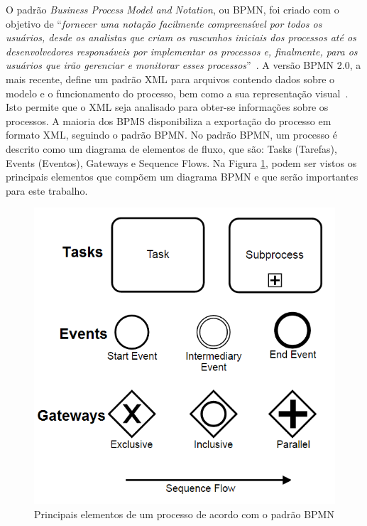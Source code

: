 \documentclass[12pt]{article}
\begin{document}

O padrão \emph{Business Process Model and Notation}, ou BPMN, foi criado com o objetivo de ``\emph{fornecer uma notação facilmente compreensível por todos os usuários, desde os analistas que criam os rascunhos iniciais dos processos até os desenvolvedores responsáveis por implementar os processos e, finalmente, para os usuários que irão gerenciar e monitorar esses processos}''~\cite{model2011notation}. A versão BPMN 2.0, a mais recente, define um padrão XML para arquivos contendo dados sobre o modelo e o funcionamento do processo, bem como a sua representação visual~\cite{Kurz:2016}. Isto permite que o XML seja analisado para obter-se informações sobre os processos. A maioria dos BPMS disponibiliza a exportação do processo em formato XML, seguindo o padrão BPMN. No padrão BPMN, um processo é descrito como um diagrama de elementos de fluxo, que são: Tasks (Tarefas), Events (Eventos), Gateways e Sequence Flows. Na Figura \ref{fig:bpmn}, podem ser vistos os principais elementos que compõem um diagrama BPMN e que serão importantes para este trabalho.

\begin{figure}[ht]
\centering
\includegraphics[width=.5\textwidth]{figuras/newbpmn.png}
\caption{Principais elementos de um processo de acordo com o padrão BPMN}
\label{fig:bpmn}
\end{figure}
\end{document}
